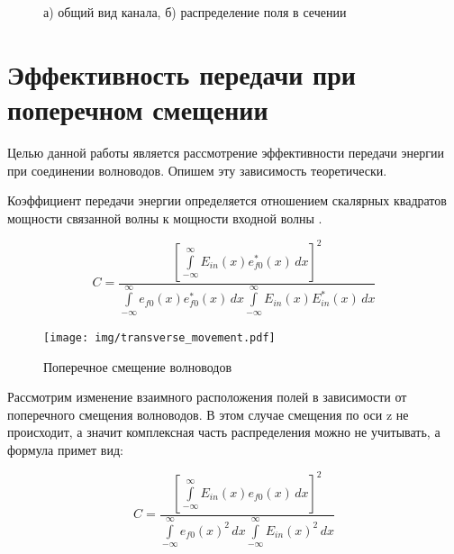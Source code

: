 \begin{figure}[h]
	\begin{minipage}[h]{0.49\linewidth}
	\end{minipage}
	\hfill
	\begin{minipage}[h]{0.49\linewidth}
	\end{minipage}
	\caption{а) общий вид канала, б) распределение поля в сечении}
	\label{polozok}
\end{figure}

\section{Эффективность передачи при поперечном смещении}

Целью данной работы является рассмотрение эффективности передачи энергии при соединении волноводов. Опишем эту зависимость теоретически.

Коэффициент передачи энергии определяется отношением скалярных квадратов мощности связанной волны к мощности входной волны \cite{lefevre}.

\begin{equation}
	\label{coupling_full}
	C = \frac{\left[\int\limits_{-\infty}^{\infty}E_{in}(x)e_{f0}^*(x) \,dx\right]^2}
	{\int\limits_{-\infty}^{\infty}e_{f0}(x)e_{f0}^*(x) \,dx
	 \int\limits_{-\infty}^{\infty}E_{in}(x)E_{in}^*(x) \,dx}
\end{equation}

\begin{figure}[h!]
	\texttt{[image: img/transverse\_movement.pdf]}
	\caption{Поперечное смещение волноводов}
	\label{transverse_movement}
\end{figure}

Рассмотрим изменение взаимного расположения полей в зависимости от поперечного смещения волноводов. В этом случае смещения по оси z не происходит, а значит комплексная часть распределения можно не учитывать, а формула примет вид:

\begin{equation}
	\label{coupling_natural}
	C = \frac{\left[\int\limits_{-\infty}^{\infty}E_{in}(x)e_{f0}(x) \,dx\right]^2}
	{\int\limits_{-\infty}^{\infty}e_{f0}(x)^2 \,dx
	 \int\limits_{-\infty}^{\infty}E_{in}(x)^2 \,dx}
\end{equation}

